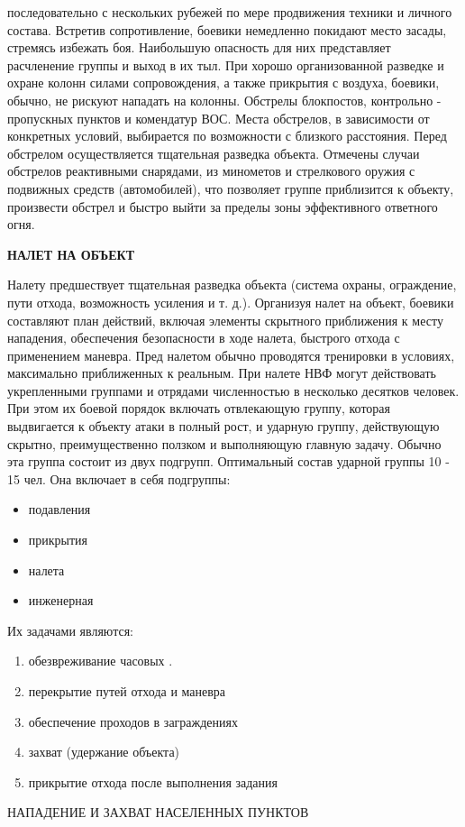 \documentclass[12pt,a4paper]{report}
\begin{document}
последовательно с нескольких рубежей по мере продвижения техники и личного состава. Встретив сопротивление, боевики немедленно покидают место засады, стремясь избежать боя. Наибольшую опасность для них представляет расчленение группы и выход в их тыл. При хорошо организованной разведке и охране колонн силами сопровождения, а также прикрытия с воздуха, боевики, обычно, не рискуют нападать на колонны. Обстрелы блокпостов, контрольно - пропускных пунктов и комендатур ВОС. Места обстрелов, в зависимости от конкретных условий, выбирается по возможности с близкого расстояния. Перед обстрелом осуществляется тщательная разведка объекта. Отмечены случаи обстрелов реактивными снарядами, из минометов и стрелкового оружия с подвижных средств (автомобилей), что позволяет группе приблизится к объекту, произвести обстрел и быстро выйти за пределы зоны эффективного ответного огня. 

\textbf{НАЛЕТ НА ОБЪЕКТ }

Налету предшествует тщательная разведка объекта (система охраны, ограждение, пути отхода, возможность усиления и т. д.). Организуя налет на объект, боевики составляют план действий, включая элементы скрытного приближения к месту нападения, обеспечения безопасности в ходе налета, быстрого отхода с применением маневра. Пред налетом обычно проводятся тренировки в условиях, максимально приближенных к реальным. При налете НВФ могут действовать укрепленными группами и отрядами численностью в несколько десятков человек. При этом их боевой порядок включать отвлекающую группу, которая выдвигается к объекту атаки в полный рост, и ударную группу, действующую скрытно, преимущественно ползком и выполняющую главную задачу. Обычно эта группа состоит из двух подгрупп. Оптимальный состав ударной группы 10 - 15 чел. 
Она включает в себя подгруппы: 
\begin{itemize}
	\item подавления 
	\item прикрытия 
	\item налета 
	\item инженерная 
\end{itemize}
Их задачами являются: 
\begin{enumerate}
	\item обезвреживание часовых .
	\item перекрытие путей отхода и маневра 
	\item обеспечение проходов в заграждениях 
	\item захват (удержание объекта) 
	\item прикрытие отхода после выполнения задания 
\end{enumerate}
НАПАДЕНИЕ И ЗАХВАТ НАСЕЛЕННЫХ ПУНКТОВ 
\end{document}
